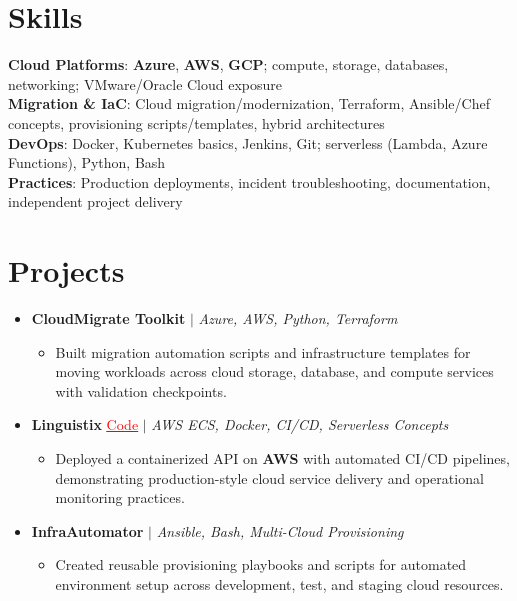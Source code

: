 \documentclass[letterpaper,10pt]{article}
\newcommand{\resumeItem}[1]{\item\small{{#1 \vspace{-2pt}}}}
\newcommand{\resumeProjectHeading}[1]{\item \small #1 \vspace{-2pt}}
\newcommand{\resumeSubHeadingListStart}{\begin{itemize}[leftmargin=0.0in, label={}]}
\newcommand{\resumeSubHeadingListEnd}{\end{itemize}}
\newcommand{\resumeProjItemListStart}{\begin{itemize}[leftmargin=0.15in,label=\textbullet,itemsep=0pt,topsep=0pt,parsep=0pt,partopsep=0pt]}
\newcommand{\resumeProjItemListEnd}{\end{itemize}\vspace{-4pt}}
\begin{document}
\section{Skills}
\begin{itemize}[leftmargin=0.15in, label={}]
\small{\item{
\textbf{Cloud Platforms}: \textbf{Azure}, \textbf{AWS}, \textbf{GCP}; compute, storage, databases, networking; VMware/Oracle Cloud exposure \\
\textbf{Migration \& IaC}: Cloud migration/modernization, Terraform, Ansible/Chef concepts, provisioning scripts/templates, hybrid architectures \\
\textbf{DevOps}: Docker, Kubernetes basics, Jenkins, Git; serverless (Lambda, Azure Functions), Python, Bash \\
\textbf{Practices}: Production deployments, incident troubleshooting, documentation, independent project delivery
}}
\end{itemize}
\vspace{-16pt}
\section{Projects}
\resumeSubHeadingListStart
\vspace{-2pt}
\resumeProjectHeading{\textbf{CloudMigrate Toolkit} $|$ \emph{Azure, AWS, Python, Terraform}}
\resumeProjItemListStart
\resumeItem{Built migration automation scripts and infrastructure templates for moving workloads across cloud storage, database, and compute services with validation checkpoints.}
\resumeProjItemListEnd
\vspace{3pt}
\resumeProjectHeading{\textbf{Linguistix} {\href{https://github.com/SAHAJ-BHADJA/Linguistix}{\textcolor{red}{\underline{Code}}}} $|$ \emph{AWS ECS, Docker, CI/CD, Serverless Concepts}}
\resumeProjItemListStart
\resumeItem{Deployed a containerized API on \textbf{AWS} with automated CI/CD pipelines, demonstrating production-style cloud service delivery and operational monitoring practices.}
\resumeProjItemListEnd
\vspace{3pt}
\resumeProjectHeading{\textbf{InfraAutomator} $|$ \emph{Ansible, Bash, Multi-Cloud Provisioning}}
\resumeProjItemListStart
\resumeItem{Created reusable provisioning playbooks and scripts for automated environment setup across development, test, and staging cloud resources.}
\resumeProjItemListEnd
\resumeSubHeadingListEnd
\end{document}

